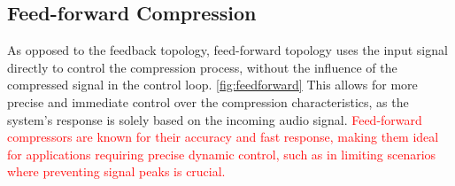\documentclass[10pt]{article}
\begin{document}
\begin{multicols*}{2}
\begin{minipage}{\linewidth}
                        \label{fig:feedback}
                    
                    \end{minipage}
                
            \subsection{Feed-forward Compression}
                As opposed to the feedback topology, feed-forward topology uses the input signal directly to control the compression process, without the influence of the compressed signal in the control loop. \ref{fig:feedforward} This allows for more precise and immediate control over the compression characteristics, as the system's response is solely based on the incoming audio signal. \textcolor{red}{Feed-forward compressors are known for their accuracy and fast response, making them ideal for applications requiring precise dynamic control, such as in limiting scenarios where preventing signal peaks is crucial.}\par

                    \noindent
                    \begin{minipage}{\linewidth}

                        \centering

\end{minipage}
\end{multicols*}
\end{document}
